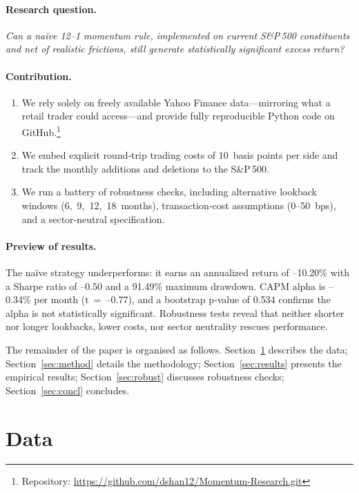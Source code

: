 \documentclass[11pt]{article}
\begin{document}
\paragraph{Research question.}
\emph{Can a naïve 12--1 momentum rule, implemented on current S\&P\,500 constituents and net of realistic frictions, still generate statistically significant excess return?}

\paragraph{Contribution.}
\begin{enumerate}[label=(\roman*)]
  \item We rely solely on freely available Yahoo Finance data—mirroring what a retail trader could access—and provide fully reproducible Python code on GitHub.\footnote{Repository: \url{https://github.com/dshan12/Momentum-Research.git}}
  \item We embed explicit round‑trip trading costs of 10~basis points per side and track the monthly additions and deletions to the S\&P\,500.
  \item We run a battery of robustness checks, including alternative lookback windows (6, 9, 12, 18 months), transaction‐cost assumptions (0–50 bps), and a sector‑neutral specification.
\end{enumerate}

\paragraph{Preview of results.}
The naïve strategy underperforms: it earns an annualized return of --10.20\% with a Sharpe ratio of --0.50 and a 91.49\% maximum drawdown.  CAPM alpha is --0.34\% per month (t~=~--0.77), and a bootstrap p‑value of 0.534 confirms the alpha is not statistically significant.  Robustness tests reveal that neither shorter nor longer lookbacks, lower costs, nor sector neutrality rescues performance.

The remainder of the paper is organised as follows.  Section~\ref{sec:data} describes the data; Section~\ref{sec:method} details the methodology; Section~\ref{sec:results} presents the empirical results; Section~\ref{sec:robust} discusses robustness checks; Section~\ref{sec:concl} concludes.

\section{Data} \label{sec:data}
\end{document}

